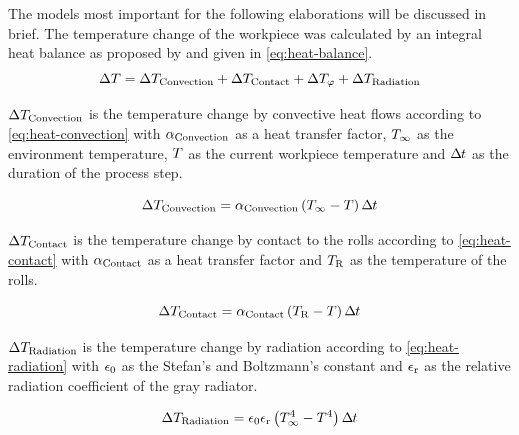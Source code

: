 
The models most important for the following elaborations will be discussed in brief.
The temperature change of the workpiece was calculated by an integral heat balance as proposed by \textcite{Hensel1990} and given in \autoref{eq:heat-balance}.
\begin{equation}
    \Delta{T} = \Delta{T}_{\mathrm{Convection}} + \Delta{T}_{\mathrm{Contact}} + \Delta{T}_{{\varphi}} + \Delta{T}_{\mathrm{Radiation}}
    \label{eq:heat-balance}
\end{equation}

\noindent$\Delta{T}_{\mathrm{Convection}}$ is the temperature change by convective heat flows according to \autoref{eq:heat-convection} with ${\alpha}_{{\mathrm{Convection}}}$ as a heat transfer factor, ${T}_{\infty}$ as the environment temperature, ${T}$ as the current workpiece temperature and ${\Delta\mspace{-1mu}t}$ as the duration of the process step.

\begin{equation}
    \Delta{T}_{\mathrm{Convection}} = {\alpha}_{{\mathrm{Convection}}} \left( {T}_{\infty} - {T} \right) {\Delta\mspace{-1mu}t}
    \label{eq:heat-convection}
\end{equation}

\noindent$\Delta{T}_{\mathrm{Contact}}$ is the temperature change by contact to the rolls according to \autoref{eq:heat-contact} with ${\alpha}_{{\mathrm{Contact}}}$ as a heat transfer factor and ${T}_{{\mathrm{R}}}$ as the temperature of the rolls.

\begin{equation}
    \Delta{T}_{\mathrm{Contact}} = {\alpha}_{{\mathrm{Contact}}} \left( {T}_{\mathrm{R}} - {T} \right) {\Delta\mspace{-1mu}t}
    \label{eq:heat-contact}
\end{equation}

\noindent$\Delta{T}_{\mathrm{Radiation}}$ is the temperature change by radiation according to \autoref{eq:heat-radiation} with ${\epsilon_0}$ as the Stefan's and Boltzmann's constant and ${\epsilon_\mathrm{r}}$ as the relative radiation coefficient of the gray radiator.

\begin{equation}
    \Delta{T}_{\mathrm{Radiation}} = {\epsilon_0} {\epsilon_\mathrm{r}} \left( {T}_{\infty}^4 - {T}^4 \right) {\Delta\mspace{-1mu}t}
    \label{eq:heat-radiation}
\end{equation}

